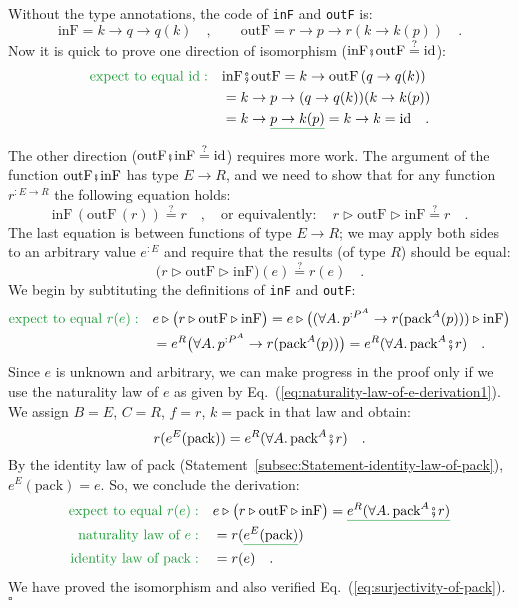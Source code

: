 Without the type annotations, the code of \lstinline!inF! and \lstinline!outF!
is:
\[
\text{inF}=k\rightarrow q\rightarrow q(k)\quad,\quad\quad\text{outF}=r\rightarrow p\rightarrow r(k\rightarrow k(p))\quad.
\]
Now it is quick to prove one direction of isomorphism ($\text{inF}\bef\text{outF}\overset{?}{=}\text{id}$):
\begin{align*}
{\color{greenunder}\text{expect to equal }\text{id}:}\quad & \text{inF}\bef\text{outF}=k\rightarrow\text{outF}\,(q\rightarrow q(k))\\
 & =k\rightarrow p\rightarrow(q\rightarrow q(k))(k\rightarrow k(p))\\
 & =k\rightarrow\gunderline{p\rightarrow k(p)}=k\rightarrow k=\text{id}\quad.
\end{align*}

The other direction ($\text{outF}\bef\text{inF}\overset{?}{=}\text{id}$)
requires more work. The argument of the function $\text{outF}\bef\text{inF}$
has type $E\rightarrow R$, and we need to show that for any function
$r^{:E\rightarrow R}$ the following equation holds: 
\[
\text{inF}\,(\text{outF}\,(r))\overset{?}{=}r\quad,\quad\text{or equivalently}:\quad r\triangleright\text{outF}\triangleright\text{inF}\overset{?}{=}r\quad.
\]
The last equation is between functions of type $E\rightarrow R$;
we may apply both sides to an arbitrary value $e^{:E}$ and require
that the results (of type $R$) should be equal:
\[
\big(r\triangleright\text{outF}\triangleright\text{inF}\big)(e)\overset{?}{=}r(e)\quad.
\]
We begin by subtituting the definitions of \lstinline!inF! and \lstinline!outF!:
\begin{align*}
{\color{greenunder}\text{expect to equal }r(e):}\quad & e\triangleright\big(r\triangleright\text{outF}\triangleright\text{inF}\big)=e\triangleright\big((\forall A.\,p^{:P^{A}}\rightarrow r(\text{pack}^{A}(p)))\triangleright\text{inF}\big)\\
 & =e^{R}\big(\forall A.\,p^{:P^{A}}\rightarrow r(\text{pack}^{A}(p))\big)=e^{R}(\forall A.\,\text{pack}^{A}\bef r)\quad.
\end{align*}
Since $e$ is unknown and arbitrary, we can make progress in the proof
only if we use the naturality law of $e$ as given by Eq.~(\ref{eq:naturality-law-of-e-derivation1}).
We assign $B=E$, $C=R$, $f=r$, $k=\text{pack}$ in that law and
obtain:
\[
r(e^{E}(\text{pack}))=e^{R}(\forall A.\,\text{pack}^{A}\bef r)\quad.
\]
By the identity law of pack (Statement~\ref{subsec:Statement-identity-law-of-pack}),
$e^{E}(\text{pack})=e$. So, we conclude the derivation:
\begin{align*}
{\color{greenunder}\text{expect to equal }r(e):}\quad & e\triangleright\big(r\triangleright\text{outF}\triangleright\text{inF}\big)=\gunderline{e^{R}(\forall A.\,\text{pack}^{A}\bef r)}\\
{\color{greenunder}\text{naturality law of }e:}\quad & =r(\gunderline{e^{E}(\text{pack})})\\
{\color{greenunder}\text{identity law of }\text{pack}:}\quad & =r(e)\quad.
\end{align*}
We have proved the isomorphism and also verified Eq.~(\ref{eq:surjectivity-of-pack}).
$\square$

